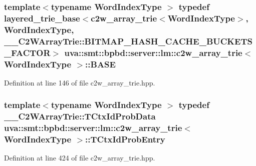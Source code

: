 \subsubsection[{B\+A\+S\+E}]{\setlength{\rightskip}{0pt plus 5cm}template$<$typename Word\+Index\+Type $>$ typedef {\bf layered\+\_\+trie\+\_\+base}$<${\bf c2w\+\_\+array\+\_\+trie}$<${\bf Word\+Index\+Type}$>$, {\bf Word\+Index\+Type}, \+\_\+\+\_\+\+C2\+W\+Array\+Trie\+::\+B\+I\+T\+M\+A\+P\+\_\+\+H\+A\+S\+H\+\_\+\+C\+A\+C\+H\+E\+\_\+\+B\+U\+C\+K\+E\+T\+S\+\_\+\+F\+A\+C\+T\+O\+R$>$ {\bf uva\+::smt\+::bpbd\+::server\+::lm\+::c2w\+\_\+array\+\_\+trie}$<$ {\bf Word\+Index\+Type} $>$\+::{\bf B\+A\+S\+E}}\label{classuva_1_1smt_1_1bpbd_1_1server_1_1lm_1_1c2w__array__trie_a8897c17fb2c7a3bbd1baa91630f886c7}


Definition at line 146 of file c2w\+\_\+array\+\_\+trie.\+hpp.

\hypertarget{classuva_1_1smt_1_1bpbd_1_1server_1_1lm_1_1c2w__array__trie_a1240bfbdc6bbb632c56970ae4d6acf91}{}
\subsubsection[{T\+Ctx\+Id\+Prob\+Entry}]{\setlength{\rightskip}{0pt plus 5cm}template$<$typename Word\+Index\+Type $>$ typedef {\bf \+\_\+\+\_\+\+C2\+W\+Array\+Trie\+::\+T\+Ctx\+Id\+Prob\+Data} {\bf uva\+::smt\+::bpbd\+::server\+::lm\+::c2w\+\_\+array\+\_\+trie}$<$ {\bf Word\+Index\+Type} $>$\+::{\bf T\+Ctx\+Id\+Prob\+Entry}\hspace{0.3cm}{\ttfamily [protected]}}\label{classuva_1_1smt_1_1bpbd_1_1server_1_1lm_1_1c2w__array__trie_a1240bfbdc6bbb632c56970ae4d6acf91}


Definition at line 424 of file c2w\+\_\+array\+\_\+trie.\+hpp.

\hypertarget{classuva_1_1smt_1_1bpbd_1_1server_1_1lm_1_1c2w__array__trie_aa01859d7132d0da6ca72acacb42f9762}{}
